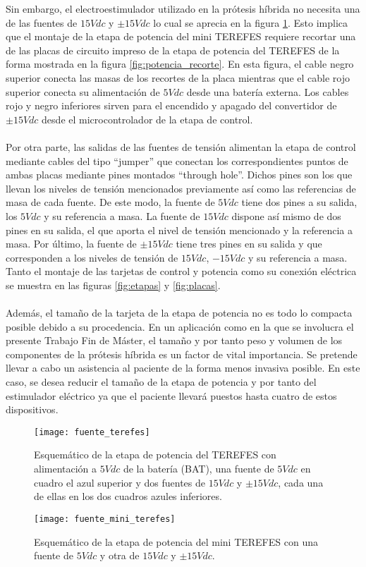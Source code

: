 Sin embargo, el electroestimulador utilizado en la prótesis híbrida no necesita una de las fuentes de $15Vdc$ y $\pm15Vdc$ lo cual se aprecia en la figura \ref{fig:fuente_mini_terefes}. Esto implica que el montaje de la etapa de potencia del mini TEREFES requiere recortar una de las placas de circuito impreso de la etapa de potencia del TEREFES de la forma mostrada en la figura \ref{fig:potencia_recorte}. En esta figura, el cable negro superior conecta las masas de los recortes de la placa mientras que el cable rojo superior conecta su alimentación de $5Vdc$ desde una batería externa. Los cables rojo y negro inferiores sirven para el encendido y apagado del convertidor de $\pm15Vdc$ desde el microcontrolador de la etapa de control. 
\\
\\
Por otra parte, las salidas de las fuentes de tensión alimentan la etapa de control mediante cables del tipo ``jumper'' que conectan los correspondientes puntos de ambas placas mediante pines montados ``through hole''. Dichos pines son los que llevan los niveles de tensión mencionados previamente así como las referencias de masa de cada fuente. De este modo, la fuente de $5Vdc$ tiene dos pines a su salida, los $5Vdc$ y su referencia a masa. La fuente de $15Vdc$ dispone así mismo de dos pines en su salida, el que aporta el nivel de tensión mencionado y la referencia a masa. Por último, la fuente de $\pm15Vdc$ tiene tres pines en su salida y que corresponden a los niveles de tensión de $15Vdc$, $-15Vdc$ y su referencia a masa. Tanto el montaje de las tarjetas de control y potencia como su conexión eléctrica se muestra en las figuras \ref{fig:etapas} y \ref{fig:placas}.
\\
\\
Además, el tamaño de la tarjeta de la etapa de potencia no es todo lo compacta posible debido a su procedencia. En un aplicación como en la que se involucra el presente Trabajo Fin de Máster, el tamaño y por tanto peso y volumen de los componentes de la prótesis híbrida es un factor de vital importancia. Se pretende llevar a cabo un asistencia al paciente de la forma menos invasiva posible. En este caso, se desea reducir el tamaño de la etapa de potencia y por tanto del estimulador eléctrico ya que el paciente llevará puestos hasta cuatro de estos dispositivos.\\

\begin{figure}[!htb]
  \texttt{[image: fuente\_terefes]}
  \caption{Esquemático de la etapa de potencia del TEREFES con alimentación a $5Vdc$ de la batería (BAT), una fuente de $5Vdc$ en cuadro el azul superior y dos fuentes de $15Vdc$ y $\pm15Vdc$, cada una de ellas en los dos cuadros azules inferiores.}\label{fig:fuente_terefes}
\endminipage\hfill
{}
  \texttt{[image: fuente\_mini\_terefes]}
  \caption{Esquemático de la etapa de potencia del mini TEREFES con una fuente de $5Vdc$ y otra de $15Vdc$ y $\pm15Vdc$.}\label{fig:fuente_mini_terefes}
\endminipage\hfill
\end{figure}

